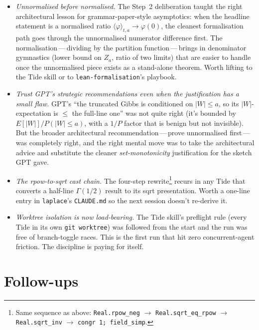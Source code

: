 \documentclass[11pt]{article}
\begin{document}
\begin{itemize}
\item \emph{Unnormalised before normalised.} The Step~2 deliberation taught
the right architectural lesson for grammar-paper-style asymptotics: when
the headline statement is a normalised ratio
$\langle\varphi\rangle_{t,a} \to \varphi(0)$, the cleanest formalisation
path goes through the unnormalised numerator difference first. The
normalisation\,---\,dividing by the partition function\,---\,brings in
denominator gymnastics (lower bound on $Z_a$, ratio of two limits) that
are easier to handle once the unnormalised piece exists as a stand-alone
theorem. Worth lifting to the Tide skill or to
\texttt{lean-formalisation}'s playbook.

\item \emph{Trust GPT's strategic recommendations even when the
justification has a small flaw.} GPT's ``the truncated Gibbs is conditioned
on $|W| \le a$, so its $|W|$-expectation is $\le$ the full-line one'' was
not quite right (it's bounded by $E[|W|]/P(|W| \le a)$, with a $1/P$
factor that is benign but not invisible). But the broader architectural
recommendation\,---\,prove unnormalised first\,---\,was completely right,
and the right mental move was to take the architectural advice and
substitute the cleaner \emph{set-monotonicity} justification for the
sketch GPT gave.

\item \emph{The rpow-to-sqrt cast chain.} The four-step rewrite\footnote{Same
sequence as above: \texttt{Real.rpow\_neg} $\to$ \texttt{Real.sqrt\_eq\_rpow}
$\to$ \texttt{Real.sqrt\_inv} $\to$ \texttt{congr 1; field\_simp}.} recurs
in any Tide that converts a half-line $\Gamma(1/2)$ result to its sqrt
presentation. Worth a one-line entry in \texttt{laplace}'s
\texttt{CLAUDE.md} so the next session doesn't re-derive it.

\item \emph{Worktree isolation is now load-bearing.} The Tide skill's
preflight rule (every Tide in its own \texttt{git worktree}) was followed
from the start and the run was free of branch-toggle races. This is the
first run that hit zero concurrent-agent friction. The discipline is paying
for itself.
\end{itemize}

\section{Follow-ups}
\end{document}
